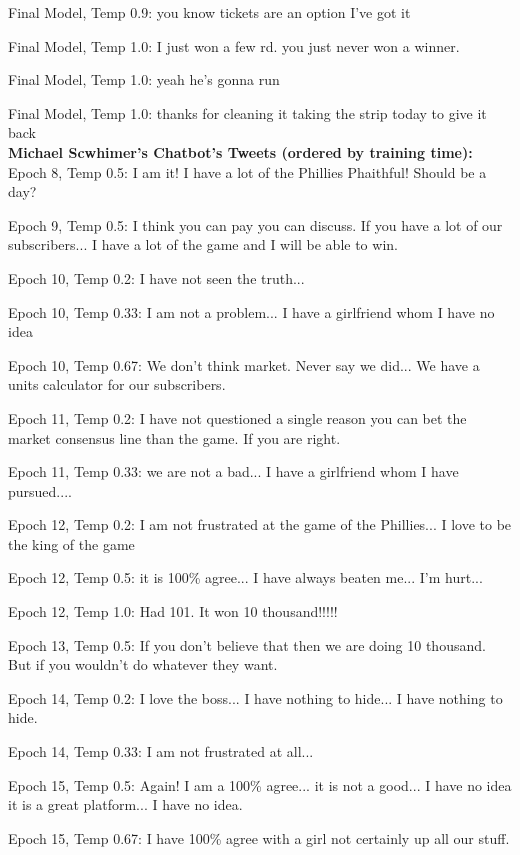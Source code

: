 \documentclass[5p,authoryear]{elsarticle}
\begin{document}
Final Model, Temp 0.9: you know tickets are an option I’ve got it

Final Model, Temp 1.0: I just won a few rd. you just never won a winner.

Final Model, Temp 1.0: yeah he’s gonna run

Final Model, Temp 1.0: thanks for cleaning it taking the strip today to give it back\\




\textbf{Michael Scwhimer’s Chatbot’s Tweets (ordered by training time):}\\

Epoch 8, Temp 0.5:
I am it! I have a lot of the Phillies Phaithful! Should be a day? 

Epoch 9, Temp 0.5:
I think you can pay you can discuss. If you have a lot of our subscribers... I have a lot of the game and I will be able to win. 

Epoch 10, Temp 0.2:
I have not seen the truth...

Epoch 10, Temp 0.33:
I am not a problem... I have a girlfriend whom I have no idea 

Epoch 10, Temp 0.67:
We don’t think market. Never say we did... We have a units calculator for our subscribers. 

Epoch 11, Temp 0.2:
I have not questioned a single reason you can bet the market consensus line than the game. If you are right. 


Epoch 11, Temp 0.33:
we are not a bad... I have a girlfriend whom I have pursued.... 

Epoch 12, Temp 0.2:
I am not frustrated at the game of the Phillies... I love to be the king of the game 

Epoch 12, Temp 0.5:
it is 100\% agree... I have always beaten me... I’m hurt... 

Epoch 12, Temp 1.0:
Had 101. It won 10 thousand!!!!!

Epoch 13, Temp 0.5:
If you don’t believe that then we are doing 10 thousand. But if you wouldn’t do whatever they want. 

Epoch 14, Temp 0.2:
I love the boss... I have nothing to hide... I have nothing to hide. 

Epoch 14, Temp 0.33:
I am not frustrated at all... 

Epoch 15, Temp 0.5:
Again! I am a 100\% agree... it is not a good... I have no idea it is a great platform... I have no idea. 

Epoch 15, Temp 0.67:
I have 100\% agree with a girl not certainly up all our stuff. 
\end{document}
